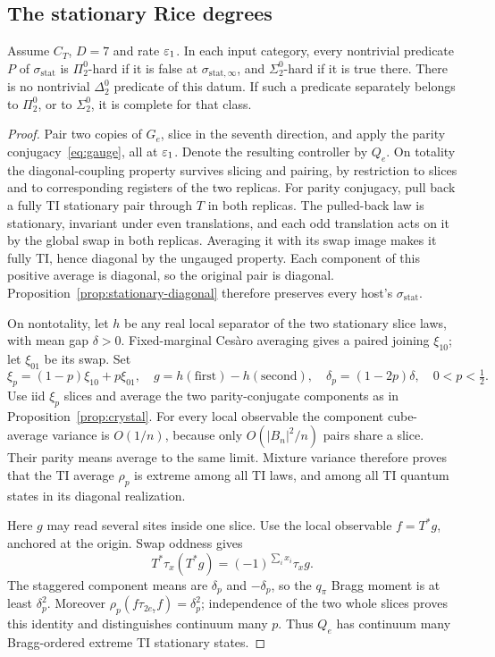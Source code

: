 \subsection{The stationary Rice degrees}
\begin{theorem}\label{thm:stationary-degrees}
Assume \(C_T\), \(D=7\) and rate \(\varepsilon_1\). In each input
category, every nontrivial predicate \(P\) of
\(\sigma_{\mathrm{stat}}\) is \(\Pi^0_2\)-hard if it is false
at \(\sigma_{\mathrm{stat},\infty}\), and \(\Sigma^0_2\)-hard
if it is true there. There is no nontrivial
\(\Delta^0_2\) predicate of this datum. If such a predicate
separately belongs to \(\Pi^0_2\), or to \(\Sigma^0_2\), it is
complete for that class.
\end{theorem}
\begin{proof}
Pair two copies of \(G_e\), slice in the seventh direction,
and apply the parity conjugacy~\eqref{eq:gauge}, all at
\(\varepsilon_1\). Denote the resulting controller by \(Q_e\).
On totality the diagonal-coupling property survives slicing
and pairing, by restriction to slices and to corresponding
registers of the two replicas. For parity conjugacy, pull back
a fully TI stationary pair through \(T\) in both replicas.
The pulled-back law is stationary, invariant under even
translations, and each odd translation acts on it by the global
swap in both replicas. Averaging it with its swap image makes
it fully TI, hence diagonal by the ungauged property.
Each component of this positive average is diagonal, so the
original pair is diagonal. Proposition~\ref{prop:stationary-diagonal}
therefore preserves every host's \(\sigma_{\mathrm{stat}}\).

On nontotality, let \(h\) be any real local separator of the
two stationary slice laws, with mean gap \(\delta>0\).
Fixed-marginal Ces\`aro averaging gives a paired joining
\(\xi_{10}\); let \(\xi_{01}\) be its swap. Set
\[
 \xi_p=(1-p)\xi_{10}+p\xi_{01},\quad
 g=h(\text{first})-h(\text{second}),\quad
 \delta_p=(1-2p)\delta,\quad 0<p<\tfrac12.
\]
Use iid \(\xi_p\) slices and average the two parity-conjugate
components as in Proposition~\ref{prop:crystal}. For every local
observable the component cube-average variance is \(O(1/n)\),
because only \(O(|B_n|^2/n)\) pairs share a slice. Their parity
means average to the same limit. Mixture variance therefore
proves that the TI average \(\rho_p\) is extreme among all TI
laws, and among all TI quantum states in its diagonal realization.

Here \(g\) may read several sites inside one slice. Use the
local observable \(f=T^*g\), anchored at the origin. Swap
oddness gives
\[
 T^*\tau_x(T^*g)=(-1)^{\sum_i x_i}\tau_xg.
\]
The staggered component means are \(\delta_p\) and
\(-\delta_p\), so the \(q_\pi\) Bragg moment is at least
\(\delta_p^2\). Moreover
\(\rho_p(f\tau_{2e_7}f)=\delta_p^2\); independence of the two
whole slices proves this identity and distinguishes continuum
many \(p\). Thus \(Q_e\) has continuum many Bragg-ordered
extreme TI stationary states.


\end{proof}
